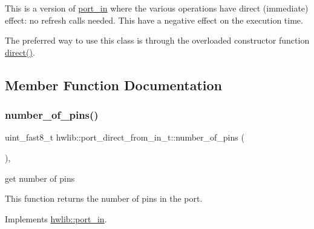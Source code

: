 This is a version of \hyperlink{classhwlib_1_1port__in}{port\+\_\+in} where the various operations have direct (immediate) effect\+: no refresh calls needed. This have a negative effect on the execution time.

The preferred way to use this class is through the overloaded constructor function \hyperlink{namespacehwlib_a43941b7f246ad934ee43dbfa0f5c8b5a}{direct()}. 

\subsection{Member Function Documentation}
\mbox{\label{classhwlib_1_1port__direct__from__in__t_a12ce68f2d796d1ddcf8b7ae1033d83a1}} 
\subsubsection{\texorpdfstring{number\+\_\+of\+\_\+pins()}{number\_of\_pins()}}
{\footnotesize\ttfamily uint\+\_\+fast8\+\_\+t hwlib\+::port\+\_\+direct\+\_\+from\+\_\+in\+\_\+t\+::number\+\_\+of\+\_\+pins (\begin{DoxyParamCaption}{ }\end{DoxyParamCaption})\hspace{0.3cm}{\ttfamily [inline]}, {\ttfamily [virtual]}}





get number of pins

This function returns the number of pins in the port. 

Implements \hyperlink{classhwlib_1_1port__in_a3498fc0158e1e460a00d671df629fe22}{hwlib\+::port\+\_\+in}.

\mbox{\label{classhwlib_1_1port__direct__from__in__t_a19f5b6527913815e206cfc2e93a52d1e}} 
